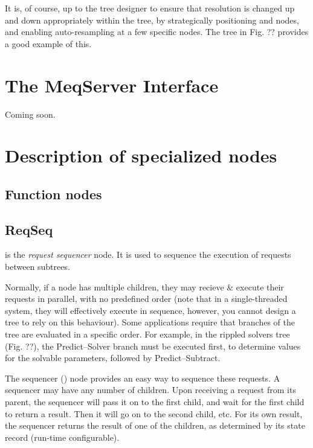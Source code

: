   It is, of course, up to the tree designer to ensure that resolution is
  changed up and down appropriately within the tree, by strategically
  positioning  and  nodes, and enabling
  auto-resampling at a few specific nodes. The tree in Fig. ?? provides a good
  example of this.

\chapter{The MeqServer Interface}
\label{chap:meqserver}
\label{sec:meqserver}
\label{sec:meqforest}

  Coming soon.

\chapter{Description of specialized nodes}

\section{Function nodes}
\label{sec:Function}

\section{ReqSeq}

   is the {\em request sequencer} node. It is used to sequence the
  execution of requests between subtrees.
  
  Normally, if a node has multiple children, they may recieve \& execute their
  requests in parallel, with no predefined order (note that in a
  single-threaded system, they will effectively execute in sequence, however,
  you cannot design a tree to rely on this behaviour). Some applications
  require that branches of the tree are evaluated in a specific order. For
  example, in the rippled solvers tree (Fig. ??), the Predict--Solver branch
  must be executed first, to determine values for the solvable parameters,
  followed by Predict--Subtract.
  
  The sequencer () node provides an easy way to sequence these
  requests. A sequencer may have any number of children. Upon receiving a
  request from its parent, the sequencer will pass it on to the first child,
  and wait for the first child to return a result. Then it will go on to the
  second child, etc. For its own result, the sequencer returns the result of
  one of the children, as determined by its state record (run-time
  configurable).

